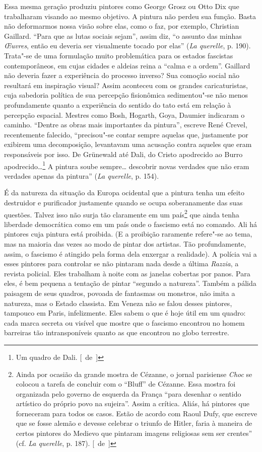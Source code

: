 Essa mesma geração produziu pintores como George Grosz ou Otto Dix que
trabalharam visando ao mesmo objetivo. A pintura não perdeu sua função.
Basta não deformarmos nossa visão sobre elas, como o faz, por
exemplo, Christian Gaillard. ``Para que as lutas sociais sejam'', assim
diz, ``o assunto das minhas \emph{\OE uvres}, então eu deveria ser
visualmente tocado por elas'' (\emph{La querelle}, p. 190). Trata"-se de
uma formulação muito problemática para os estados fascistas contemporâneos, em cujas cidades e aldeias reina a
``calma e a ordem''. Gaillard não
deveria fazer a experiência do processo inverso? Sua comoção social não
resultará em inspiração visual? Assim aconteceu com os grandes
caricaturistas, cuja sabedoria política de sua percepção fisionômica
sedimentou"-se não menos profundamente quanto a experiência do sentido do
tato está em relação à percepção espacial. Mestres como Bosh, Hogarth,
Goya, Daumier indicaram o caminho. ``Dentre as obras mais importantes da
pintura'', escreve René Crevel, recentemente falecido, ``precisou"-se
contar sempre aquelas que, justamente por exibirem uma
decomposição, levantavam uma acusação contra aqueles que eram responsáveis por isso. De Grünewald
até Dali, do Cristo apodrecido ao Burro apodrecido\ldots{}\footnote{Um quadro de
  Dali. [~de~]} A pintura soube sempre\ldots{} descobrir novas verdades que não
eram verdades apenas da pintura'' (\emph{La querelle}, p. 154).

É da natureza da situação da Europa ocidental que a pintura tenha um efeito destruidor e purificador justamente quando se ocupa soberanamente das suas questões.
Talvez isso não surja tão claramente em um
país\footnote{Ainda por ocasião da grande mostra de Cézanne, o jornal
  parisiense \emph{Choc} se colocou a tarefa de concluir com o ``Bluff'' de
  Cézanne. Essa mostra foi organizada pelo governo de esquerda da França
  ``para desenhar o sentido artístico do próprio povo na sujeira''.
  Assim a crítica. Aliás, há pintores que forneceram para todos os casos.
  Estão de acordo com Raoul Dufy, que escreve que se fosse alemão e
  devesse celebrar o triunfo de Hitler, faria à maneira de certos
  pintores do Medievo que pintaram imagens religiosas sem ser
  crentes'' (cf. \emph{La querelle}, p. 187). [~de~]} que ainda tenha liberdade
democrática como em um país onde o fascismo está no comando. Ali há
pintores cuja pintura está proibida. (E a proibição raramente refere"-se
ao tema, mas na maioria das vezes ao modo de pintar dos artistas. Tão
profundamente, assim, o fascismo é atingido pela forma dela enxergar a realidade). A
polícia vai a esses pintores para controlar se não pintaram nada
desde a última \emph{Razzia}, a revista policial. Eles trabalham à noite
com as janelas cobertas por panos. Para eles, é bem pequena a tentação
de pintar ``segundo a natureza''. Também a pálida paisagem de seus
quadros, povoada de fantasmas ou monstros, não imita a
natureza, mas o Estado classista. Em Veneza não se falou desses
pintores, tampouco em Paris, infelizmente. Eles sabem o que é hoje útil
em um quadro: cada marca secreta ou visível que mostre que o fascismo
encontrou no homem barreiras tão intransponíveis quanto as que encontrou no globo
terrestre.
